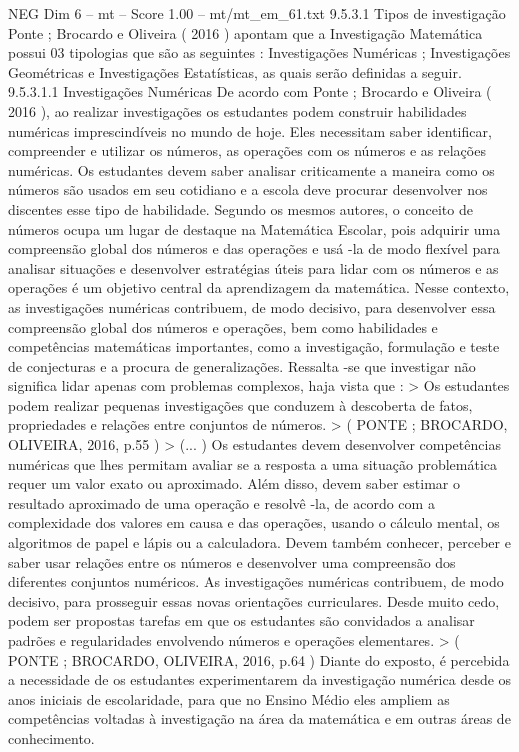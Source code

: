 \begin{textsample}{NEG Dim 6 – mt – Score 1.00 – mt/mt\_em\_61.txt}  \label{ex:f6_neg_129}
9.5.3.1 Tipos de investigação Ponte ; Brocardo e Oliveira ( 2016 ) apontam que a Investigação Matemática possui 03 tipologias que são as seguintes : Investigações Numéricas ; Investigações Geométricas e Investigações Estatísticas, as quais serão definidas a seguir. 9.5.3.1.1 Investigações Numéricas De acordo com Ponte ; Brocardo e Oliveira ( 2016 ), ao realizar investigações os estudantes podem construir habilidades numéricas imprescindíveis no mundo de hoje.
Eles necessitam saber identificar, compreender e utilizar os números, as operações com os números e as relações numéricas.
Os estudantes devem saber analisar criticamente a maneira como os números são usados em seu cotidiano e a escola deve procurar desenvolver nos discentes esse tipo de habilidade.
Segundo os mesmos autores, o conceito de números ocupa um lugar de destaque na Matemática Escolar, pois adquirir uma compreensão global dos números e das operações e usá -la de modo flexível para analisar situações e desenvolver estratégias úteis para lidar com os números e as operações é um objetivo central da aprendizagem da matemática.
Nesse contexto, as investigações numéricas contribuem, de modo decisivo, para desenvolver essa compreensão global dos números e operações, bem como habilidades e competências matemáticas importantes, como a investigação, formulação e teste de conjecturas e a procura de generalizações.
Ressalta -se que investigar não significa lidar apenas com problemas complexos, haja vista que : > Os estudantes podem realizar pequenas investigações que conduzem à descoberta de fatos, propriedades e relações entre conjuntos de números. > ( PONTE ; BROCARDO, OLIVEIRA, 2016, p.55 ) > (... ) Os estudantes devem desenvolver competências numéricas que lhes permitam avaliar se a resposta a uma situação problemática requer um valor exato ou aproximado.
Além disso, devem saber estimar o resultado aproximado de uma operação e resolvê -la, de acordo com a complexidade dos valores em causa e das operações, usando o cálculo mental, os algoritmos de papel e lápis ou a calculadora.
Devem também conhecer, perceber e saber usar relações entre os números e desenvolver uma compreensão dos diferentes conjuntos numéricos.
As investigações numéricas contribuem, de modo decisivo, para prosseguir essas novas orientações curriculares.
Desde muito cedo, podem ser propostas tarefas em que os estudantes são convidados a analisar padrões e regularidades envolvendo números e operações elementares. > ( PONTE ; BROCARDO, OLIVEIRA, 2016, p.64 ) Diante do exposto, é percebida a necessidade de os estudantes experimentarem da investigação numérica desde os anos iniciais de escolaridade, para que no Ensino Médio eles ampliem as competências voltadas à investigação na área da matemática e em outras áreas de conhecimento.

\end{textsample}
